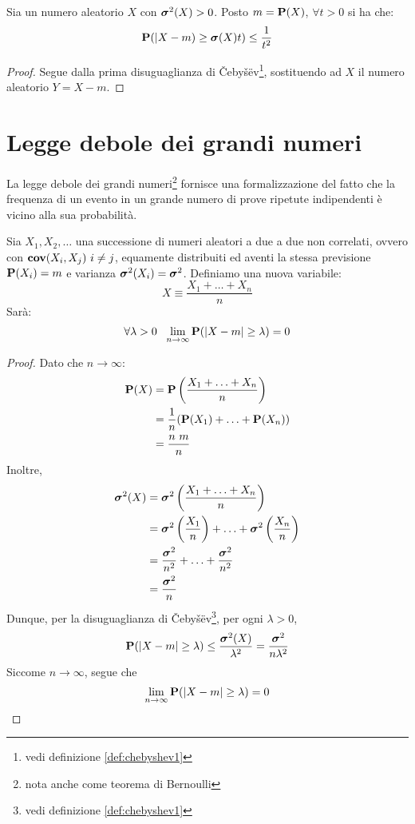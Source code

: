 \begin{definition}\label{def:chebyshev2}
  Sia un numero aleatorio $X$ con \( \boldsymbol\sigma^2(X) > 0 \). Posto \( m = \mathbf{P}(X) \), \( \forall t > 0 \) si ha che:
  \[
  \mathbf{P}(|X - m) \ge \boldsymbol\sigma(X)t) \le \frac{1}{t^2}
  \]
\end{definition}

\begin{proof}
  Segue dalla prima disuguaglianza di Čebyšëv\footnote{vedi definizione \ref{def:chebyshev1}}, sostituendo ad $X$ il numero aleatorio \( Y = X - m \).
\end{proof}


\section{Legge debole dei grandi numeri} %
La legge debole dei grandi numeri\footnote{nota anche come teorema di Bernoulli} fornisce una formalizzazione del fatto che la frequenza di un evento in un grande numero di prove ripetute indipendenti è vicino alla sua probabilità.

\begin{theorem}\label{thm:teorema_bernoulli}
  Sia \( X_1,X_2, \ldots \) una successione di numeri aleatori a due a due non correlati, ovvero con \( \mathbf{cov}(X_i, X_j) ~ i \ne j \), equamente distribuiti ed aventi la stessa previsione \( \mathbf{P}(X_i) = m \) e varianza \( \boldsymbol\sigma^2(X_i) = \boldsymbol\sigma^2 \).
  Definiamo una nuova variabile:
  \[ X \equiv \frac{X_1 + \ldots + X_n}{n} \]
  Sarà:
  \[ \forall \lambda > 0 ~~ \lim_{n \rightarrow \infty} \mathbf{P}(|X - m| \ge \lambda) = 0 \]
\end{theorem}

\begin{proof}
  Dato che \( n \rightarrow \infty \):
  \begin{align*}
    \mathbf{P}(X) &= \mathbf{P} \left( \frac{X_1 + \ldots + X_n}{n} \right) \\
    &= \frac{1}{n} (\mathbf{P}(X_1) + \ldots + \mathbf{P}(X_n)) \\
    &= \frac{n~m}{n}
  \end{align*}
  Inoltre,
  \begin{align*}
    \boldsymbol\sigma^2(X) &= \boldsymbol\sigma^2 \left( \frac{X_1 + \ldots + X_n}{n} \right) \\
    &= \boldsymbol\sigma^2 \left( \frac{X_1}{n} \right) + \ldots + \boldsymbol\sigma^2 \left( \frac{X_n}{n} \right) \\
    &= \frac{\boldsymbol\sigma^2}{n^2} + \ldots + \frac{\boldsymbol\sigma^2}{n^2} \\
    &= \frac{\boldsymbol\sigma^2}{n}
  \end{align*}
  Dunque, per la disuguaglianza di Čebyšëv\footnote{vedi definizione \ref{def:chebyshev1}}, per ogni \( \lambda > 0 \),
  \[ \mathbf{P}(|X - m| \ge \lambda) \le \frac{\boldsymbol\sigma^2(X)}{\lambda^2} = \frac{\boldsymbol\sigma^2}{n \lambda^2} \]
  Siccome \( n \rightarrow \infty \), segue che
  \[ \lim_{n \rightarrow \infty} \mathbf{P}(|X - m| \ge \lambda) = 0 \]
\end{proof}

